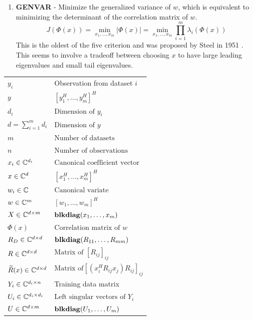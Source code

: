 \begin{enumerate}
\item \textbf{GENVAR} - Minimize the generalized variance of $w$, which is equivalent to
  minimizing the determinant of the correlation matrix of $w$.
  \begin{equation*}
    J(\Phi(x)) = \min_{x_1,\dots,x_m}\left|\Phi(x)\right| = \min_{x_1,\dots,x_m}\prod_{i=1}^m\lambda_i(\Phi(x))
  \end{equation*}
  This is the oldest of the five criterion and was proposed by Steel in 1951
  \cite{steel1951minimum}. This seems to involve a tradeoff between choosing $x$ to have
  large leading eigenvalues and small tail eigenvalues.
\end{enumerate}

\begin{table}[h!]
  \centering
  \begin{tabular}{ll}
    \midrule
    $y_i$ & Observation from dataset $i$ \\
    $y$ &  $[y_1^H,\dots,y_m^H]^H$\\ 
    $d_i$ & $\text{Dimension of } y_i$ \\
    $d=\sum_{i=1}^md_i$& $\text{Dimension of } y$\\ 
    $m$ & $\text{Number of datasets}$ \\
    $n$ & $\text{Number of observations}$\\ 
    $x_i\in\mathbb{C}^{d_i}$ & $\text{Canonical coefficient vector}$ \\
    $x\in\mathbb{C}^d$ & $[x_1^H,\dots,x_m^H]^H$\\ 
    $w_i\in\mathbb{C}$ & $\text{Canonical variate}$\\
    $w\in\mathbb{C}^m$ & $[w_1,\dots,w_m]^H$\\ 
    $X\in\mathbb{C}^{d\times m}$ & $\mathop{\bf blkdiag}(x_1,\dots,x_m)$ \\
    $\Phi(x)$ &  $\text{Correlation matrix of }w$\\ 
    $R_D\in\mathbb{C}^{d\times d}$ & $\mathop{\bf blkdiag}(R_{11},\dots,R_{mm})$\\
    $R\in\mathbb{C}^{d\times d}$ & $\text{Matrix of } [R_{ij}]_{ij}$\\ 
    $\widetilde{R}(x)\in\mathbb{C}^{d\times d}$ & $\text{Matrix of}
    [(x_i^HR_{ij}x_j)R_{ij}]_{ij}$ \\
    $Y_i\in\mathbb{C}^{d_i\times n}$ & Training data matrix\\
    $U_i\in\mathbb{C}^{d_i\times d_i}$ & $\text{Left singular vectors of } Y_i$\\
    $U\in\mathbb{C}^{d\times m}$ & $\mathop{\bf blkdiag}(U_1,\dots,U_m)$\\ 

\end{tabular}
\end{table}
